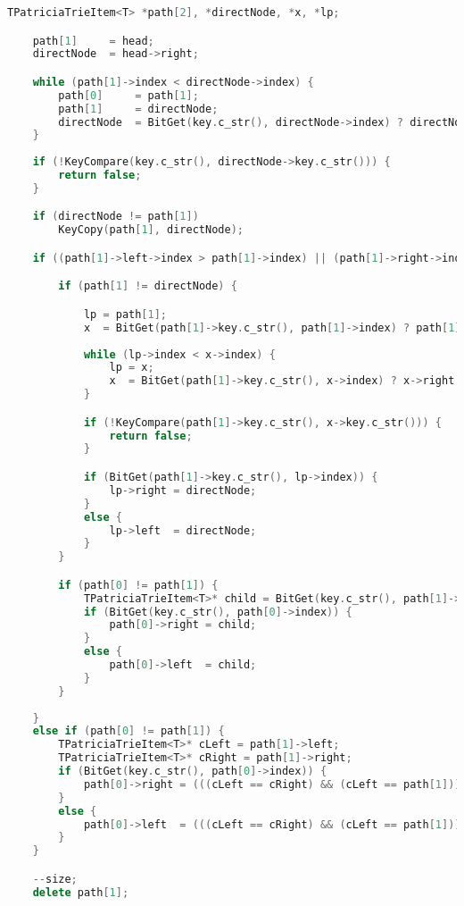 \begin{lstlisting}[language=C++]
    TPatriciaTrieItem<T> *path[2], *directNode, *x, *lp;

    path[1]     = head;
    directNode  = head->right;

    while (path[1]->index < directNode->index) {
        path[0]     = path[1];
        path[1]     = directNode;
        directNode  = BitGet(key.c_str(), directNode->index) ? directNode->right : directNode->left;
    }
    
    if (!KeyCompare(key.c_str(), directNode->key.c_str())) {
        return false;
    }

    if (directNode != path[1])
        KeyCopy(path[1], directNode);

    if ((path[1]->left->index > path[1]->index) || (path[1]->right->index > path[1]->index)) {

        if (path[1] != directNode) {

            lp = path[1];
            x  = BitGet(path[1]->key.c_str(), path[1]->index) ? path[1]->right : path[1]->left;
 
            while (lp->index < x->index) {
                lp = x;
                x  = BitGet(path[1]->key.c_str(), x->index) ? x->right : x->left;
            }

            if (!KeyCompare(path[1]->key.c_str(), x->key.c_str())) {
                return false;
            }

            if (BitGet(path[1]->key.c_str(), lp->index)) {
                lp->right = directNode;
            }
            else {
                lp->left  = directNode;
            }
        }

        if (path[0] != path[1]) {
            TPatriciaTrieItem<T>* child = BitGet(key.c_str(), path[1]->index) ? path[1]->left : path[1]->right;
            if (BitGet(key.c_str(), path[0]->index)) {
                path[0]->right = child;
            }
            else {
                path[0]->left  = child;
            }
        }
   
    }
    else if (path[0] != path[1]) {
        TPatriciaTrieItem<T>* cLeft = path[1]->left;
        TPatriciaTrieItem<T>* cRight = path[1]->right;
        if (BitGet(key.c_str(), path[0]->index)) {
            path[0]->right = (((cLeft == cRight) && (cLeft == path[1])) ? path[0] : ((cLeft==path[1]) ? cRight : cLeft ));
        }
        else {
            path[0]->left  = (((cLeft == cRight) && (cLeft == path[1])) ? path[0] : ((cLeft==path[1]) ? cRight : cLeft ));
        }
    }

    --size;
    delete path[1];


\end{lstlisting}
